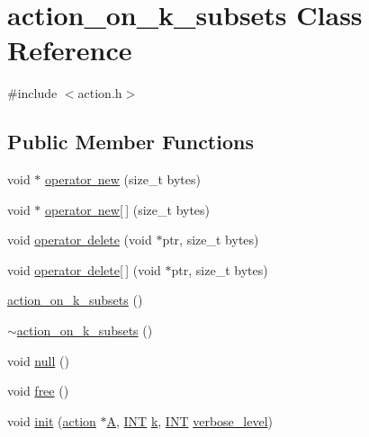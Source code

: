 \hypertarget{classaction__on__k__subsets}{}\section{action\+\_\+on\+\_\+k\+\_\+subsets Class Reference}
\label{classaction__on__k__subsets}


{\ttfamily \#include $<$action.\+h$>$}

\subsection*{Public Member Functions}
\begin{DoxyCompactItemize}
\item 
void $\ast$ \mbox{\hyperlink{classaction__on__k__subsets_a9aeb6aa687a2566ba8f69a018c4a18cf}{operator new}} (size\+\_\+t bytes)
\item 
void $\ast$ \mbox{\hyperlink{classaction__on__k__subsets_ae10362aa1df16fddcbee78aa68650d0e}{operator new\mbox{[}$\,$\mbox{]}}} (size\+\_\+t bytes)
\item 
void \mbox{\hyperlink{classaction__on__k__subsets_aeb3fbae9066072d9ccb28c02f8777e3d}{operator delete}} (void $\ast$ptr, size\+\_\+t bytes)
\item 
void \mbox{\hyperlink{classaction__on__k__subsets_addcfa00d15b973abb85bb7327fd9dd4a}{operator delete\mbox{[}$\,$\mbox{]}}} (void $\ast$ptr, size\+\_\+t bytes)
\item 
\mbox{\hyperlink{classaction__on__k__subsets_a8a35d463811c0aedcece14b7be7a7419}{action\+\_\+on\+\_\+k\+\_\+subsets}} ()
\item 
\mbox{\hyperlink{classaction__on__k__subsets_aa7337af815f2cda443ef45608eb9c26f}{$\sim$action\+\_\+on\+\_\+k\+\_\+subsets}} ()
\item 
void \mbox{\hyperlink{classaction__on__k__subsets_af4e272326fe21821693d189c30b65c95}{null}} ()
\item 
void \mbox{\hyperlink{classaction__on__k__subsets_a2acb6066d1df683d30d8e640e0613e6f}{free}} ()
\item 
void \mbox{\hyperlink{classaction__on__k__subsets_a76ad74d653ba2b0d6ac8715b77060874}{init}} (\mbox{\hyperlink{classaction}{action}} $\ast$\mbox{\hyperlink{classaction__on__k__subsets_a2fe6d509c85e0076f7729c4e22e9f50b}{A}}, \mbox{\hyperlink{galois_8h_a09fddde158a3a20bd2dcadb609de11dc}{I\+NT}} \mbox{\hyperlink{classaction__on__k__subsets_af03f2c37ce7e6084da384d9785794e67}{k}}, \mbox{\hyperlink{galois_8h_a09fddde158a3a20bd2dcadb609de11dc}{I\+NT}} \mbox{\hyperlink{simeon_8_c_a818073fbcc2f439e7c56952f67386122}{verbose\+\_\+level}})

\end{DoxyCompactItemize}
